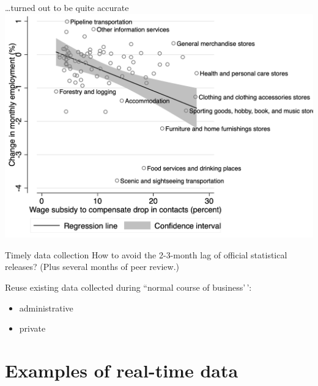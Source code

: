 \documentclass[
  ignorenonframetext,
  aspectratio=1610,
]{beamer}
\providecommand{\tightlist}{%
  \setlength{\itemsep}{0pt}\setlength{\parskip}{0pt}}
\begin{document}
\begin{frame}{\ldots turned out to be quite accurate}
\protect\hypertarget{turned-out-to-be-quite-accurate}{}
\includegraphics{exhibit/fig5.png}
\end{frame}

\begin{frame}{Timely data collection}
\protect\hypertarget{timely-data-collection}{}
How to avoid the 2-3-month lag of official statistical releases? (Plus
several months of peer review.)

Reuse existing data collected during ``normal course of business'\,':

\begin{itemize}
\tightlist
\item
  administrative
\item
  private
\end{itemize}
\end{frame}

\hypertarget{examples-of-real-time-data}{%
\section{Examples of real-time data}\label{examples-of-real-time-data}}
\end{document}
